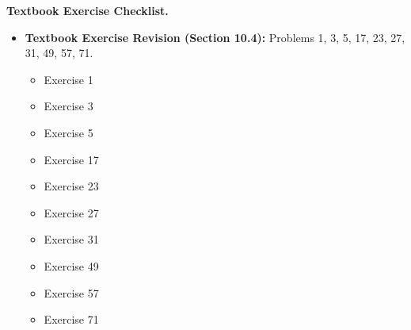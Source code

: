 \documentclass{../../../templates/natsirt}
\newenvironment{reviewbox}[1][]{\begin{whitebox}[#1]\textbf{Textbook Exercise Checklist. }}{\end{whitebox}}
\newcommand{\citem}{\item[$\square$]}
\begin{document}
\begin{reviewbox}
    \begin{itemize}
        \citem \textbf{Textbook Exercise Revision (Section 10.4):} Problems 1, 3, 5, 17, 23, 27, 31, 49, 57, 71.
        \begin{itemize}
            \citem Exercise 1
            \citem Exercise 3
            \citem Exercise 5
            \citem Exercise 17
            \citem Exercise 23
            \citem Exercise 27
            \citem Exercise 31
            \citem Exercise 49
            \citem Exercise 57
            \citem Exercise 71
        \end{itemize}
    \end{itemize}
\end{reviewbox}
\end{document}
